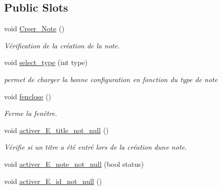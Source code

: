\subsection*{Public Slots}
\begin{DoxyCompactItemize}
\item 
\mbox{\label{class_creation___note_a533d14d9799dfb6257de99778d38a8ba}} 
void \hyperlink{class_creation___note_a533d14d9799dfb6257de99778d38a8ba}{Creer\+\_\+\+Note} ()
\begin{DoxyCompactList}\small\item\em Vérification de la création de la note. \end{DoxyCompactList}\item 
void \hyperlink{class_creation___note_a4627e5957db87af2b7c43937857e9d6e}{select\+\_\+type} (int type)
\begin{DoxyCompactList}\small\item\em permet de charger la bonne configuration en fonction du type de note \end{DoxyCompactList}\item 
\mbox{\label{class_creation___note_a0c3fbd0f18c5145903f14c1ce137ba3d}} 
void \hyperlink{class_creation___note_a0c3fbd0f18c5145903f14c1ce137ba3d}{fenclose} ()
\begin{DoxyCompactList}\small\item\em Ferme la fenêtre. \end{DoxyCompactList}\item 
\mbox{\label{class_creation___note_a222f2225fc657cec0abd511e2d00226d}} 
void \hyperlink{class_creation___note_a222f2225fc657cec0abd511e2d00226d}{activer\+\_\+\+E\+\_\+title\+\_\+not\+\_\+null} ()
\begin{DoxyCompactList}\small\item\em Vérifie si un titre a été entré lors de la création d\textquotesingle{}une note. \end{DoxyCompactList}\item 
void \hyperlink{class_creation___note_ad786b2c2e3273160009e560a8de2ab6c}{activer\+\_\+\+E\+\_\+note\+\_\+not\+\_\+null} (bool status)
\item 
\mbox{\label{class_creation___note_af7a9ff90131d51056a8e88806c9a9fbc}} 
void \hyperlink{class_creation___note_af7a9ff90131d51056a8e88806c9a9fbc}{activer\+\_\+\+E\+\_\+id\+\_\+not\+\_\+null} ()

\end{DoxyCompactItemize}
